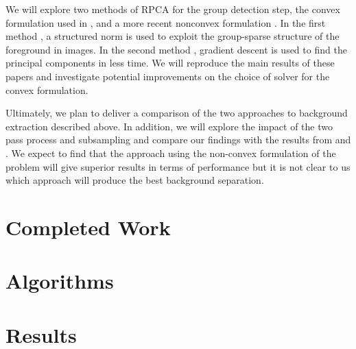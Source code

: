 \documentclass[a4paper]{article}
\begin{document}
We will explore two methods of RPCA for the group detection step, the convex formulation used in \cite{xin_liu_background_2015}, and a more recent nonconvex formulation \cite{yi_fast_2016}. In the first method \cite{xin_liu_background_2015}, a structured norm is used to exploit the group-sparse structure of the foreground in images. In the second method \cite{yi_fast_2016}, gradient descent is used to find the principal components in less time. We will reproduce the main results of these papers and investigate potential improvements on the choice of solver for the convex formulation. \newline

Ultimately, we plan to deliver a comparison of the two approaches to background extraction described above. In addition, we will explore the impact of the two pass process and subsampling and compare our findings with the results from \cite{xin_liu_background_2015} and \cite{yi_fast_2016}. We expect to find that the approach using the non-convex formulation of the problem will give superior results in terms of performance but it is not clear to us which approach will produce the best background separation.
\section{Completed Work}

\section{Algorithms}


\section{Results}
\label{sec:results}




\end{document}
